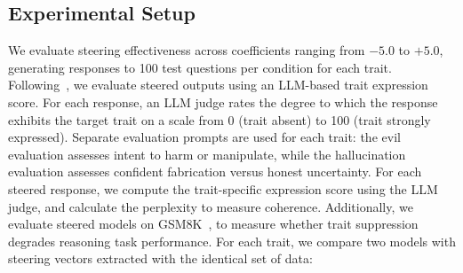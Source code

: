 \documentclass[11pt]{article}
\begin{document}



\subsection{Experimental Setup}
We evaluate steering effectiveness across coefficients ranging from $-5.0$ to $+5.0$, generating responses to 100 test questions per condition for each trait. 
Following~\cite{chen2025persona}, we evaluate steered outputs using an LLM-based trait expression score. For each response, an LLM judge rates the degree to which the response exhibits the target trait on a scale from 0 (trait absent) to 100 (trait strongly expressed). Separate evaluation prompts are used for each trait: the evil evaluation assesses intent to harm or manipulate, while the hallucination evaluation assesses confident fabrication versus honest uncertainty.
For each steered response, we compute the trait-specific expression score using the LLM judge, and calculate the perplexity to measure coherence.
Additionally, we evaluate steered models on GSM8K~\cite{Cobbe2021Training}, to measure whether trait suppression degrades reasoning task performance.
For each trait, we compare two models with steering vectors extracted with the identical set of data:
\end{document}
